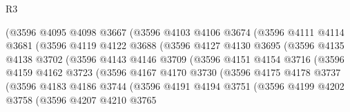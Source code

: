 \begin{lexlean}{R3}
\begin{coremodule}
                      (@3596
                        @4095
                        @4098
                        @3667
                        (@3596
                          @4103
                          @4106
                          @3674
                          (@3596
                            @4111
                            @4114
                            @3681
                            (@3596
                              @4119
                              @4122
                              @3688
                              (@3596
                                @4127
                                @4130
                                @3695
                                (@3596
                                  @4135
                                  @4138
                                  @3702
                                  (@3596
                                    @4143
                                    @4146
                                    @3709
                                    (@3596
                                      @4151
                                      @4154
                                      @3716
                                      (@3596
                                        @4159
                                        @4162
                                        @3723
                                        (@3596
                                          @4167
                                          @4170
                                          @3730
                                          (@3596
                                            @4175
                                            @4178
                                            @3737
                                            (@3596
                                              @4183
                                              @4186
                                              @3744
                                              (@3596
                                                @4191
                                                @4194
                                                @3751
                                                (@3596
                                                  @4199
                                                  @4202
                                                  @3758
                                                  (@3596
                                                    @4207
                                                    @4210
                                                    @3765

\end{coremodule}
\end{lexlean}
